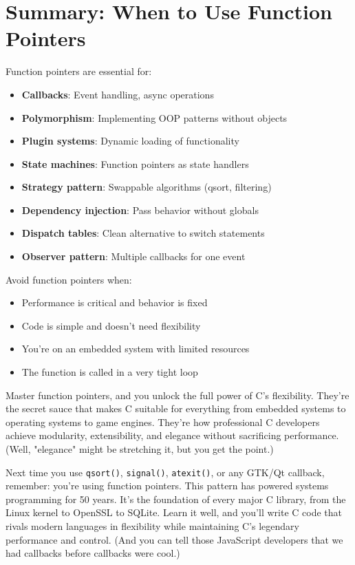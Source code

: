 \section{Summary: When to Use Function Pointers}

Function pointers are essential for:

\begin{itemize}
    \item \textbf{Callbacks}: Event handling, async operations
    \item \textbf{Polymorphism}: Implementing OOP patterns without objects
    \item \textbf{Plugin systems}: Dynamic loading of functionality
    \item \textbf{State machines}: Function pointers as state handlers
    \item \textbf{Strategy pattern}: Swappable algorithms (qsort, filtering)
    \item \textbf{Dependency injection}: Pass behavior without globals
    \item \textbf{Dispatch tables}: Clean alternative to switch statements
    \item \textbf{Observer pattern}: Multiple callbacks for one event
\end{itemize}

Avoid function pointers when:

\begin{itemize}
    \item Performance is critical and behavior is fixed
    \item Code is simple and doesn't need flexibility
    \item You're on an embedded system with limited resources
    \item The function is called in a very tight loop
\end{itemize}

Master function pointers, and you unlock the full power of C's flexibility. They're the secret sauce that makes C suitable for everything from embedded systems to operating systems to game engines. They're how professional C developers achieve modularity, extensibility, and elegance without sacrificing performance. (Well, "elegance" might be stretching it, but you get the point.)

\begin{tipbox}
Next time you use \texttt{qsort()}, \texttt{signal()}, \texttt{atexit()}, or any GTK/Qt callback, remember: you're using function pointers. This pattern has powered systems programming for 50 years. It's the foundation of every major C library, from the Linux kernel to OpenSSL to SQLite. Learn it well, and you'll write C code that rivals modern languages in flexibility while maintaining C's legendary performance and control. (And you can tell those JavaScript developers that we had callbacks before callbacks were cool.)
\end{tipbox}
